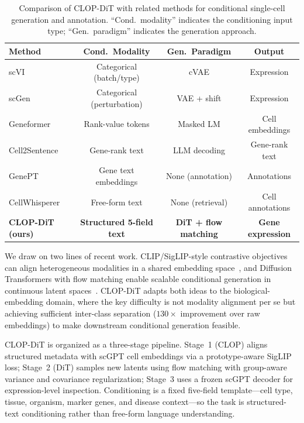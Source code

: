 \begin{table}[ht]
\caption{Comparison of CLOP-DiT with related methods for conditional single-cell generation and annotation. ``Cond.\ modality'' indicates the conditioning input type; ``Gen.\ paradigm'' indicates the generation approach.\label{tab:method-comparison}}
\centering
\small
\begin{tabular}{lccc}
\toprule
\textbf{Method} & \textbf{Cond.\ Modality} & \textbf{Gen.\ Paradigm} & \textbf{Output} \\
\midrule
scVI~\citep{ref-scvi}           & Categorical (batch/type) & cVAE               & Expression \\
scGen~\citep{ref-scgen}         & Categorical (perturbation) & VAE + shift       & Expression \\
Geneformer~\citep{ref-geneformer} & Rank-value tokens & Masked LM           & Cell embeddings \\
Cell2Sentence~\citep{ref-cell2sentence} & Gene-rank text   & LLM decoding        & Gene-rank text \\
GenePT~\citep{ref-genept}       & Gene text embeddings     & None (annotation)   & Annotations \\
CellWhisperer~\citep{ref-cellwhisperer} & Free-form text           & None (retrieval)    & Cell annotations \\
\textbf{CLOP-DiT (ours)}       & \textbf{Structured 5-field text} & \textbf{DiT + flow matching} & \textbf{Gene expression} \\
\bottomrule
\end{tabular}
\end{table}

We draw on two lines of recent work. CLIP/SigLIP-style contrastive objectives can align heterogeneous modalities in a shared embedding space~\citep{ref-clip,ref-siglip}, and Diffusion Transformers with flow matching enable scalable conditional generation in continuous latent spaces~\citep{ref-dit,ref-flow-matching,ref-albergo-flow,ref-rectified-flow}. CLOP-DiT adapts both ideas to the biological-embedding domain, where the key difficulty is not modality alignment per se but achieving sufficient inter-class separation ($130\times$ improvement over raw embeddings) to make downstream conditional generation feasible.

CLOP-DiT is organized as a three-stage pipeline. Stage~1 (CLOP) aligns structured metadata with scGPT cell embeddings via a prototype-aware SigLIP loss; Stage~2 (DiT) samples new latents using flow matching with group-aware variance and covariance regularization; Stage~3 uses a frozen scGPT decoder for expression-level inspection. Conditioning is a fixed five-field template---cell type, tissue, organism, marker genes, and disease context---so the task is structured-text conditioning rather than free-form language understanding.

